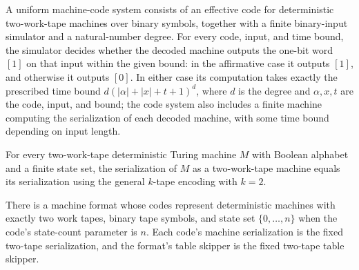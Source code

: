 \begin{definition}
\label{Turing.UniformMachineCode2}
\leanok
{}
A uniform machine-code system consists of an effective code for deterministic
two-work-tape machines over binary symbols, together with a finite binary-input
simulator and a natural-number degree. For every code, input, and time bound, the
simulator decides whether the decoded machine outputs the one-bit word $[1]$ on that
input within the given bound: in the affirmative case it outputs $[1]$, and otherwise it
outputs $[0]$. In either case its computation takes exactly the prescribed time bound
$d(|\alpha|+|x|+t+1)^d$, where $d$ is the degree and $\alpha,x,t$ are the code, input,
and bound; the code system also includes a finite machine computing the serialization of
each decoded machine, with some time bound depending on input length.
\end{definition}

\begin{lemma}
\label{Turing.Code2TM.serialize_eq_serializeK}
\leanok
{}
For every two-work-tape deterministic Turing machine $M$ with Boolean alphabet and a
finite state set, the serialization of $M$ as a two-work-tape machine equals its
serialization using the general $k$-tape encoding with $k=2$.
\end{lemma}

\begin{definition}
\label{Turing.twoTapeMachineFormat}
\leanok
{}
There is a machine format whose codes represent deterministic machines with exactly two
work tapes, binary tape symbols, and state set $\{0,\ldots,n\}$ when the code's
state-count parameter is $n$. Each code's machine serialization is the fixed two-tape
serialization, and the format's table skipper is the fixed two-tape table skipper.
\end{definition}

